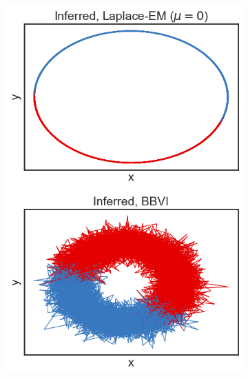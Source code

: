 \begin{figure}
\begin{subfigure}[b]{0.33\linewidth}
        \includegraphics[width=\linewidth]{./Figures/vdp-bad-mu0.png}
        \caption{}
        \label{badvdp:b}
        \vspace{4ex}
    \end{subfigure}%
    \begin{subfigure}[b]{0.33\linewidth}
        \centering

\end{subfigure}
\end{figure}
